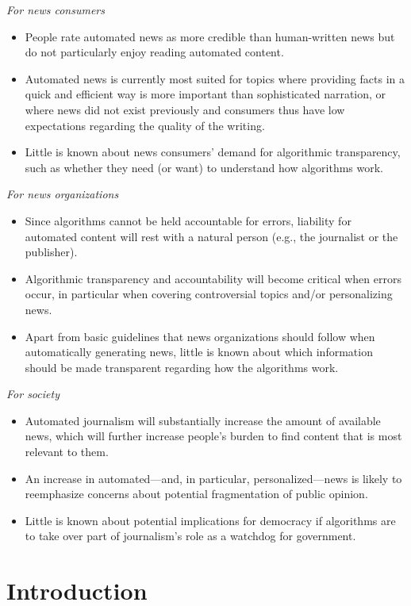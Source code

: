 \documentclass[notoc, symmetric, nobib, nols]{towcenter-guideto-book}
\begin{document}
\textit{For news consumers}
\begin{itemize}
\item People rate automated news as more credible than human-written news but do not particularly enjoy reading automated content.
\item Automated news is currently most suited for topics where providing facts in a quick and efficient way is more important than sophisticated narration, or where news did not exist previously and consumers thus have low expectations regarding the quality of the writing. 
\item Little is known about news consumers' demand for algorithmic transparency, such as whether they need (or want) to understand how algorithms work. 
\end{itemize}

\textit{For news organizations}
\begin{itemize}
\item Since algorithms cannot be held accountable for errors, liability for automated content will rest with a natural person (e.g., the journalist or the publisher).
\item Algorithmic transparency and accountability will become critical when errors occur, in particular when covering controversial topics and/or personalizing news.
\item Apart from basic guidelines that news organizations should follow when automatically generating news, little is known about which information should be made transparent regarding how the algorithms work. 
\end{itemize}

\textit{For society}
\begin{itemize}
\item Automated journalism will substantially increase the amount of available news, which will further increase people's burden to find content that is most relevant to them. 
\item An increase in automated---and, in particular, personalized---news is likely to reemphasize concerns about potential fragmentation of public opinion.
\item Little is known about potential implications for democracy if algorithms are to take over part of journalism's role as a watchdog for government.  
\end{itemize}

\chapter{Introduction}
\end{document}

